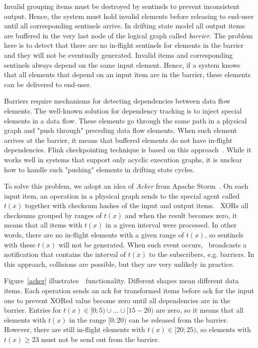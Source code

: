 Invalid grouping items must be destroyed by sentinels to prevent inconsistent output. Hence, the system must hold invalid elements before releasing to end-user until all corresponding sentinels arrive. In drifting state model all output items are buffered in the very last node of the logical graph called {\em barrier}. The problem here is to detect that there are no in-flight sentinels for elements in the barrier and they will not be eventually generated. Invalid items and corresponding sentinels always depend on the same input element. Hence, if a system knows that all elements that depend on an input item are in the barrier, these elements can be delivered to end-user. 

Barriers require mechanisms for detecting dependencies between data flow elements. The well-known solution for dependency tracking is to inject special elements in a data flow. These elements go through the same path in a physical graph and "push through" preceding data flow elements. When such element arrives at the barrier, it means that buffered elements do not have in-flight dependencies. Flink checkpointing technique is based on this approach~\cite{Carbone:2017:SMA:3137765.3137777}. While it works well in systems that support only acyclic execution graphs, it is unclear how to handle such "pushing" elements in drifting state cycles. 

To solve this problem, we adopt an idea of {\em Acker} from Apache Storm~\cite{apache:storm}. On each input item, an operation in a physical graph sends to the special agent called~{\em \Acker\ } $t(x)$ together with checksum hashes of the input and output items. \Acker\ XORs all checksums grouped by ranges of $t(x)$ and when the result becomes zero, it means that all items with $t(x)$ in a given interval were processed. In other words, there are no in-flight elements with a given range of $t(x)$, so sentinels with these $t(x)$ will not be generated. When such event occurs, \Acker\ broadcasts a notification that contains the interval of $t(x)$ to the subscribers, e.g. barriers. In this approach, collisions are possible, but they are very unlikely in practice.

Figure~\ref{acker} illustrates~\Acker\ functionality. Different shapes mean different data items. Each operation sends an ack for transformed items before ack for the input one to prevent XORed value become zero until all dependencies are in the barrier. Entries for $t(x) \in [0;5) \cup ... \cup [15-20)$ are zero, so it means that all elements with $t(x)$ in the range $[0;20)$ can be released from the barrier. However, there are still in-flight elements with $t(x) \in [20;25)$, so elements with $t(x) \geq 23$ must not be send out from the barrier.

